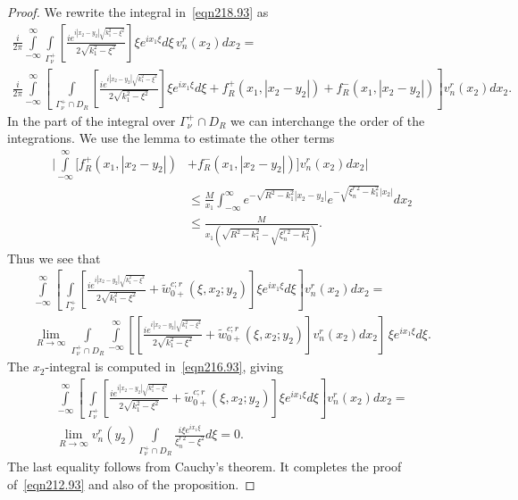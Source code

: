 \documentclass[11pt]{article}
\newcommand\tw{\tilde w_{0+}}
\theoremstyle{definition}
\theoremstyle{remark}
\begin{document}
\begin{proof}
     We rewrite the integral in~\eqref{eqn218.93} as
     \begin{multline}
       \frac{i}{2\pi}
    \int\limits_{-\infty}^{\infty}\int\limits_{\Gamma_{\nu}^+}
    \left[\frac{ie^{i|x_2-y_2|\sqrt{k_1^2-\xi^2}}}{2\sqrt{k_1^2-\xi^2}}\right]\xi
    e^{ix_1\xi}d\xi\, v_n^{r}(x_2)dx_2=\\
    \frac{i}{2\pi}
    \int\limits_{-\infty}^{\infty}\left[\,\int\limits_{\Gamma_{\nu}^+\cap D_R}
      \left[\frac{ie^{i|x_2-y_2|\sqrt{k_1^2-\xi^2}}}{2\sqrt{k_1^2-\xi^2}}\right]\xi
      e^{ix_1\xi}d\xi+f_R^+(x_1,|x_2-y_2|)+
    f_R^-(x_1,|x_2-y_2|)\right] v_n^{r}(x_2)dx_2.
     \end{multline}
     In the part of the integral over $\Gamma_{\nu}^+\cap D_R$ we can
     interchange the order of the integrations. We use the lemma to estimate
     the other terms
     \begin{equation}
       \begin{split}
       \Bigg| \int\limits_{-\infty}^{\infty}[f_R^+(x_1,|x_2-y_2|)&+
         f_R^-(x_1,|x_2-y_2|)] v_n^{r}(x_2)dx_2\Bigg| \\
       &\leq
       \frac{M}{x_1}\int_{-\infty}^{\infty}e^{-\sqrt{R^2-k_1^2}|x_2-y_2|}e^{-\sqrt{\xi_n^{r\,2}-k_1^2}|x_2|}dx_2\\
       &\leq\frac{M}{x_1(\sqrt{R^2-k_1^2}-\sqrt{\xi_n^{r\,2}-k_1^2})}.
       \end{split}
     \end{equation}
     Thus we see that
       \begin{multline}\label{eqn227.93}
       \int\limits_{-\infty}^{\infty}\left[\,\int\limits_{\Gamma_{\nu}^+}
    \left[\frac{ie^{i|x_2-y_2|\sqrt{k_1^2-\xi^2}}}{2\sqrt{k_1^2-\xi^2}}+
       \tw^{c;r}(\xi,x_2;y_2)\right]\xi e^{ix_1\xi}d\xi\right]
    v_n^{r}(x_2)dx_2=\\
    \lim_{R\to\infty}
     \int\limits_{\Gamma_{\nu}^+\cap  D_R}\int\limits_{-\infty}^{\infty}\left[
    \left[\frac{ie^{i|x_2-y_2|\sqrt{k_1^2-\xi^2}}}{2\sqrt{k_1^2-\xi^2}}+
       \tw^{c;r}(\xi,x_2;y_2)\right]v_n^{r}(x_2)dx_2\right]\,\xi e^{ix_1\xi}
    d\xi.
       \end{multline}
       The $x_2$-integral is computed in~\eqref{eqn216.93}, giving
     \begin{multline}\label{eqn228.93}
      \int\limits_{-\infty}^{\infty}\left[\,\int\limits_{\Gamma_{\nu}^+}
    \left[\frac{ie^{i|x_2-y_2|\sqrt{k_1^2-\xi^2}}}{2\sqrt{k_1^2-\xi^2}}+
       \tw^{c;r}(\xi,x_2;y_2)\right]\xi e^{ix_1\xi}d\xi\right]
    v_n^{r}(x_2)dx_2=\\
    \lim_{R\to\infty}
     v_n^{r}(y_2)\int\limits_{\Gamma_{\nu}^+\cap  D_R}\frac{i\xi e^{ix_1\xi}}{\xi_n^{r\,2}-\xi^2} d\xi=0.   
     \end{multline}
    The last equality follows from Cauchy's theorem. It completes the proof
    of~\eqref{eqn212.93} and also of the proposition.
\end{proof}
\end{document}
